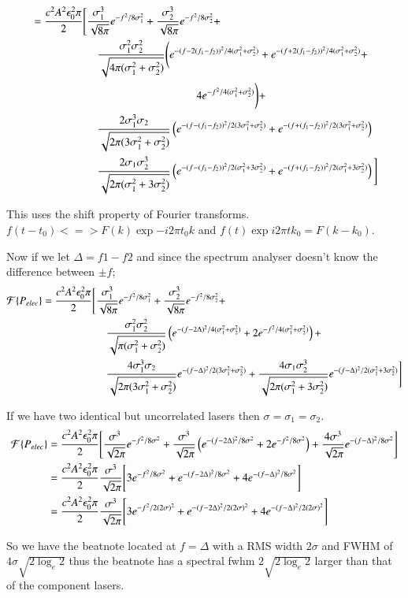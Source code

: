 \begin{align}
&= \frac{c^2A^2\epsilon_0^2 \pi}{2}\Bigg[\frac{\sigma_1^3}{\sqrt{8\pi}} e^{-f^2/8\sigma_1^2} + \frac{\sigma_2^3}{\sqrt{8\pi}} e^{-f^2/8\sigma_2^2} + \notag\\
&\quad\quad\quad\quad\quad\quad \frac{\sigma_1^2\sigma_2^2}{\sqrt{4\pi(\sigma_1^2+\sigma_2^2)}}\Bigg(e^{-(f-2(f_1-f_2))^2/4(\sigma_1^2+\sigma_2^2)} + e^{-(f+2(f_1-f_2))^2/4(\sigma_1^2+\sigma_2^2)}+\notag\\
&\quad\quad\quad\quad\quad\quad  \quad\quad\quad\quad\quad\quad\quad\quad\quad 4e^{-f^2/4(\sigma_1^2+\sigma_2^2)} \Bigg) +\notag\\
&\quad\quad\quad\quad\quad\quad  \frac{2\sigma_1^3\sigma_2}{\sqrt{2\pi(3\sigma_1^2+\sigma_2^2)}}\left(e^{-(f-(f_1-f_2))^2/2(3\sigma_1^2+\sigma_2^2)}+e^{-(f+(f_1-f_2))^2/2(3\sigma_1^2+\sigma_2^2)}\right)\notag\\
&\quad\quad\quad\quad\quad\quad  \frac{2\sigma_1\sigma_2^3}{\sqrt{2\pi(\sigma_1^2+3\sigma_2^2)}}\left(e^{-(f-(f_1-f_2))^2/2(\sigma_1^2+3\sigma_2^2)}+e^{-(f+(f_1-f_2))^2/2(\sigma_1^2+3\sigma_2^2)}\right)\Bigg]
\end{align}

This uses the shift property of Fourier transforms. $f(t-t_0) <=> F(k)\exp{-i2\pi t_0 k}$ and $f(t)\exp{i2\pi t k_0} = F(k-k_0)$.

Now if we let $\Delta=f1-f2$ and since the spectrum analyser doesn't know the difference between $\pm f$;
\begin{align}
\mathcal{F}\{P_{elec}\} &= \frac{c^2A^2\epsilon_0^2 \pi}{2}\Bigg[\frac{\sigma_1^3}{\sqrt{8\pi}} e^{-f^2/8\sigma_1^2} + \frac{\sigma_2^3}{\sqrt{8\pi}} e^{-f^2/8\sigma_2^2} + \notag\\
&\quad\quad\quad\quad\quad\quad \frac{\sigma_1^2\sigma_2^2}{\sqrt{\pi(\sigma_1^2+\sigma_2^2)}}\left(e^{-(f-2\Delta)^2/4(\sigma_1^2+\sigma_2^2)} + 2e^{-f^2/4(\sigma_1^2+\sigma_2^2)} \right) +\notag\\
&\quad\quad\quad\quad\quad\quad  \frac{4\sigma_1^3\sigma_2}{\sqrt{2\pi(3\sigma_1^2+\sigma_2^2)}}e^{-(f-\Delta)^2/2(3\sigma_1^2+\sigma_2^2)}+\frac{4\sigma_1\sigma_2^3}{\sqrt{2\pi(\sigma_1^2+3\sigma_2^2)}}e^{-(f-\Delta)^2/2(\sigma_1^2+3\sigma_2^2)}\Bigg]
\end{align}

If we have two identical but uncorrelated lasers then $\sigma=\sigma_1=\sigma_2$.
\begin{align}
\mathcal{F}\{P_{elec}\} &= \frac{c^2A^2\epsilon_0^2 \pi}{2}\Bigg[\frac{\sigma^3}{\sqrt{2\pi}} e^{-f^2/8\sigma^2} + \frac{\sigma^3}{\sqrt{2\pi}}\left(e^{-(f-2\Delta)^2/8\sigma^2} + 2e^{-f^2/8\sigma^2} \right) + \frac{4\sigma^3}{\sqrt{2\pi}}e^{-(f-\Delta)^2/8\sigma^2}\Bigg]\notag\\
&= \frac{c^2A^2\epsilon_0^2 \pi}{2}\frac{\sigma^3}{\sqrt{2\pi}}\Bigg[3e^{-f^2/8\sigma^2} + e^{-(f-2\Delta)^2/8\sigma^2} + 4e^{-(f-\Delta)^2/8\sigma^2}\Bigg]\notag\\
&= \frac{c^2A^2\epsilon_0^2 \pi}{2}\frac{\sigma^3}{\sqrt{2\pi}}\Bigg[3e^{-f^2/2(2\sigma)^2} + e^{-(f-2\Delta)^2/2(2\sigma)^2} + 4e^{-(f-\Delta)^2/2(2\sigma)^2}\Bigg]
\end{align}

So we have the beatnote located at $f=\Delta$ with a RMS width $2\sigma$ and FWHM of $4\sigma\sqrt{2\log_e{2}}$ thus the beatnote has a spectral \gls{fwhm} $2\sqrt{2\log_e{2}}$ larger than that of the component lasers.
